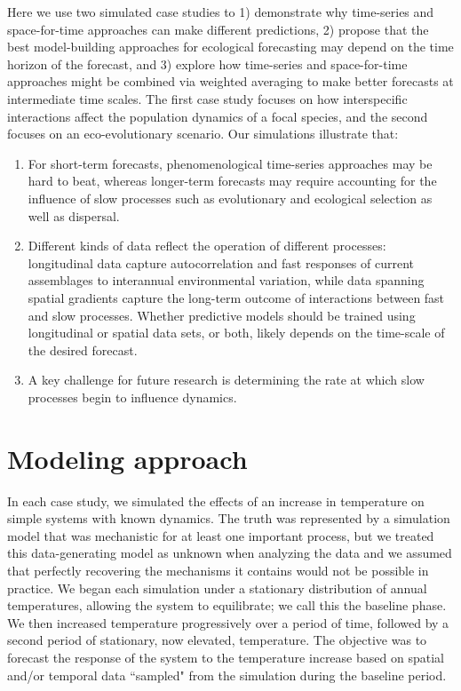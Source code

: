 \documentclass[11pt]{article}
\begin{document}
Here we use two simulated case studies to 1) demonstrate why time-series and space-for-time approaches can make different predictions, 2) propose that the best model-building approaches for ecological forecasting 
may depend on the time horizon of the forecast, and 3) explore how time-series and space-for-time approaches might be 
combined via weighted averaging to make better forecasts at intermediate time scales. The first case study
focuses on how interspecific interactions affect the population dynamics of a focal species, and the second focuses on
an eco-evolutionary scenario. Our simulations illustrate that: 
\begin{enumerate}
	\item For short-term forecasts, phenomenological time-series approaches may be hard to beat, whereas longer-term forecasts may require accounting for the influence of slow processes such as evolutionary and ecological selection as well as dispersal.
	\item Different kinds of data reflect the operation of different processes: longitudinal data capture autocorrelation and fast responses of current assemblages to interannual environmental variation, while data spanning spatial gradients capture the long-term outcome of interactions between fast and slow processes.  Whether predictive models should be trained using longitudinal or spatial data sets, or both, likely depends on the time-scale of the desired forecast.
	\item A key challenge for future research is determining the rate at which slow processes begin to influence dynamics.
\end{enumerate}

\section*{Modeling approach}

In each case study, we simulated the effects of an increase in temperature on simple systems with known dynamics.
The truth was represented by a simulation model that was mechanistic for at least one important process, 
but we treated this data-generating model as unknown when analyzing the data and we assumed that perfectly recovering the mechanisms
it contains would not be possible in practice. We began each simulation
under a stationary distribution of annual temperatures, allowing the system to equilibrate; we call this the baseline phase. 
We then increased temperature progressively over a period of time, followed by a second period of stationary, now elevated, temperature. 
The objective was to forecast the response of the system to the temperature increase based on spatial and/or temporal data 
``sampled" from the simulation during the baseline period. 
\end{document}
